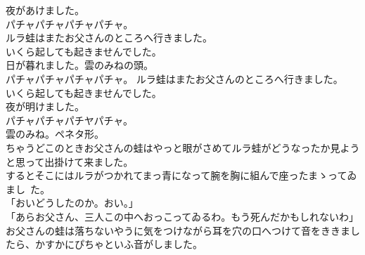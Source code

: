 \documentclass[
a4paper,
10pt,
book]
{tarticle}
\begin{document}
\newpage
\setcounter{page}{27}
\thispagestyle{fancy}
\begin{linenumbers}
    \indent 夜があけました。\\
    \indent \indent \indent \indent パチャパチャパチャパチャ。\\
    \indent ルラ蛙はまたお父さんのところへ行きました。\\
    \indent いくら起しても起きませんでした。\\
    \indent 日が暮れました。雲のみねの頭。\\
    \indent \indent \indent \indent パチャパチャパチャパチャ。
    \indent ルラ蛙はまたお父さんのところへ行きました。\\
    \indent いくら起しても起きませんでした。\\
    \indent 夜が明けました。\\
    \indent \indent \indent \indent パチャパチャパチヤパチャ。\\
    \indent 雲のみね。ペネタ形。\\
    \indent ちゃうどこのときお父さんの蛙はやっと眼がさめてルラ蛙がどうなったか見ようと思って出掛けて来ました。\\
    \indent するとそこにはルラがつかれてまっ青になって腕を胸に組んで座ったまゝってゐまし~た。\\
    「おいどうしたのか。おい。」\\
    「あらお父さん、三人この中へおっこってゐるわ。もう死んだかもしれないわ」\\
    \indent お父さんの蛙は落ちないやうに気をつけながら耳を穴の口へつけて音をききましたら、かすかにぴちゃといふ音がしました。
\end{linenumbers}
\end{document}
